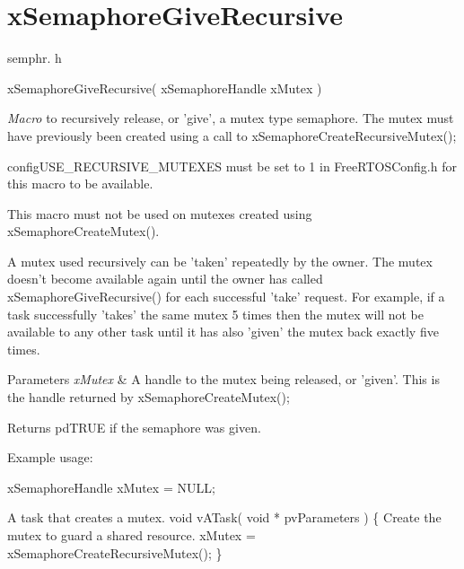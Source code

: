 \hypertarget{group__x_semaphore_give_recursive}{\section{x\-Semaphore\-Give\-Recursive}
\label{group__x_semaphore_give_recursive}
}
semphr. h 
\begin{DoxyPre}xSemaphoreGiveRecursive( xSemaphoreHandle xMutex )\end{DoxyPre}


{\itshape Macro} to recursively release, or 'give', a mutex type semaphore. The mutex must have previously been created using a call to x\-Semaphore\-Create\-Recursive\-Mutex();

config\-U\-S\-E\-\_\-\-R\-E\-C\-U\-R\-S\-I\-V\-E\-\_\-\-M\-U\-T\-E\-X\-E\-S must be set to 1 in Free\-R\-T\-O\-S\-Config.\-h for this macro to be available.

This macro must not be used on mutexes created using x\-Semaphore\-Create\-Mutex().

A mutex used recursively can be 'taken' repeatedly by the owner. The mutex doesn't become available again until the owner has called x\-Semaphore\-Give\-Recursive() for each successful 'take' request. For example, if a task successfully 'takes' the same mutex 5 times then the mutex will not be available to any other task until it has also 'given' the mutex back exactly five times.


\begin{DoxyParams}{Parameters}
{\em x\-Mutex} & A handle to the mutex being released, or 'given'. This is the handle returned by x\-Semaphore\-Create\-Mutex();\\
\hline
\end{DoxyParams}
\begin{DoxyReturn}{Returns}
pd\-T\-R\-U\-E if the semaphore was given.
\end{DoxyReturn}
Example usage\-: 
\begin{DoxyPre}
 xSemaphoreHandle xMutex = NULL;\end{DoxyPre}



\begin{DoxyPre}A task that creates a mutex.
 void vATask( void * pvParameters )
 \{
Create the mutex to guard a shared resource.
    xMutex = xSemaphoreCreateRecursiveMutex();
 \}\end{DoxyPre}




